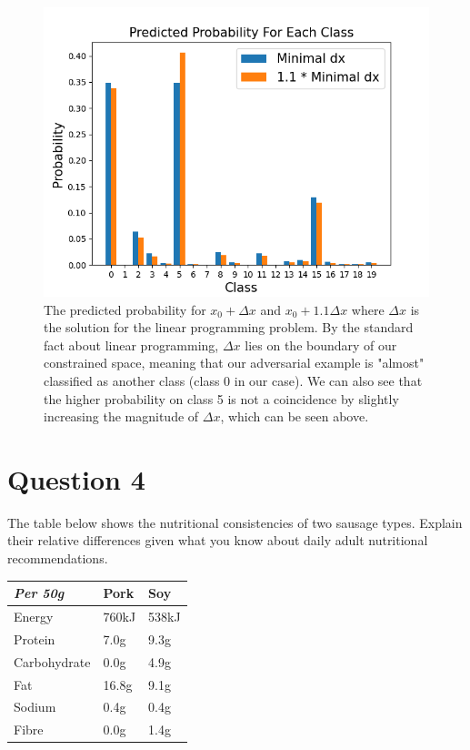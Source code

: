 \documentclass[
	12pt, %
]{../Template/fphw}
\begin{document}
\begin{enumerate}[label = (\arabic*)]
    \begin{figure}[!htbp]
        \centering
        \includegraphics[width=\linewidth]{HW1/q4-5.png}
        \caption{The predicted probability for $x_0+\Delta x$ and $x_0+1.1\Delta x$ where $\Delta x$ is the solution for the linear programming problem. By the standard fact about linear programming, $\Delta x$ lies on the boundary of our constrained space, meaning that our adversarial example is "almost" classified as another class (class 0 in our case). We can also see that the higher probability on class 5 is not a coincidence by slightly increasing the magnitude of $\Delta x$, which can be seen above.}
        \label{fig:q4-5}
    \end{figure}
\end{enumerate}


\section*{Question 4 }

\begin{problem}
	The table below shows the nutritional consistencies of two sausage types. Explain their relative differences given what you know about daily adult nutritional recommendations.
	
	\bigskip
    
	\begin{center}
		\begin{tabular}{l l l}
			\toprule
			\textit{Per 50g} & Pork & Soy \\
			\midrule
			Energy & 760kJ & 538kJ\\
			Protein & 7.0g & 9.3g\\
			Carbohydrate & 0.0g & 4.9g\\
			Fat & 16.8g & 9.1g\\
			Sodium & 0.4g & 0.4g\\
			Fibre & 0.0g & 1.4g\\
			\bottomrule
		\end{tabular}
	\end{center}
	
	\medskip
\end{problem}
\end{document}
